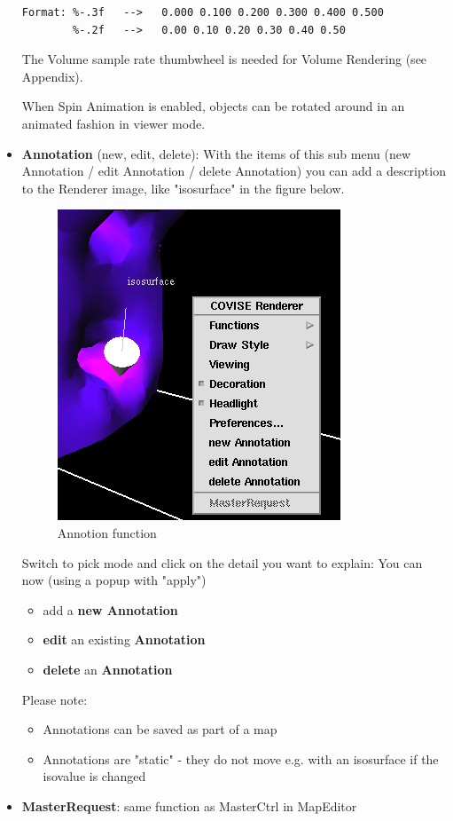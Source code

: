 \begin{itemize}
\begin{verbatim}
Format: %-.3f   -->   0.000 0.100 0.200 0.300 0.400 0.500
        %-.2f   -->   0.00 0.10 0.20 0.30 0.40 0.50
\end{verbatim}	
The Volume sample rate thumbwheel is needed for
Volume Rendering (see Appendix).


When Spin Animation is enabled, objects can be rotated around in an
animated fashion in viewer mode.


\item {\bf Annotation} (new, edit, delete): With the items of this sub menu (new Annotation / edit Annotation /
delete Annotation) you can add a description to the Renderer image, like "isosurface" in
the figure below.

 \latexonly
 \begin{figure}[htp]
  \begin{center}
   \includegraphics[scale=0.7]{renderer/pict/annotation}
   \caption{Annotion function}
	\label{fig57a}
  \end{center}
 \end{figure}
 \endlatexonly
 
Switch to pick mode and click on the detail you want to explain:
You can now (using a popup with "apply")
\begin{itemize}
\item add a {\bf new Annotation}
\item {\bf edit} an existing {\bf Annotation}
\item {\bf delete} an {\bf Annotation}
\end{itemize}

Please note:
\begin{itemize}
\item Annotations can be saved as part of a map
\item Annotations are "static" - they do not move e.g. with an isosurface if the isovalue is changed
\end{itemize}

\item {\bf MasterRequest}: same function as MasterCtrl in MapEditor

\end{itemize}
